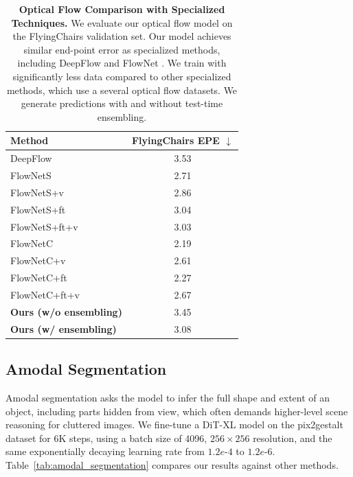 \documentclass[manuscript,screen,review]{acmart}
\begin{document}
\begin{table}[htbp]
  \centering
\begin{tabular}{lc}
\toprule
\textbf{Method} & \textbf{FlyingChairs EPE} $\downarrow$ \\
\midrule
DeepFlow & 3.53 \\
FlowNetS & 2.71 \\
FlowNetS+v & 2.86 \\
FlowNetS+ft & 3.04 \\
FlowNetS+ft+v & 3.03 \\
FlowNetC & 2.19 \\
FlowNetC+v & 2.61 \\
FlowNetC+ft & 2.27 \\
FlowNetC+ft+v & 2.67 \\
\midrule
\textbf{Ours (w/o ensembling)} & 3.45 \\
\textbf{Ours (w/ ensembling)} & 3.08 \\
\bottomrule
\end{tabular}
\caption{\textbf{Optical Flow Comparison with Specialized Techniques.} We evaluate our optical flow model on the FlyingChairs validation set. Our model achieves similar end-point error as specialized methods, including DeepFlow \citep{weinzaepfel2013deepflow} and FlowNet \citep{fischer2015flownet}. We train with significantly less data compared to other specialized methods, which use a several optical flow datasets. We generate predictions with and without test-time ensembling.}
\label{tab:optical_flow}
\end{table}




\subsection{Amodal Segmentation}

Amodal segmentation asks the model to infer the full shape and extent of an object, including parts hidden from view, which often demands higher-level scene reasoning for cluttered images. We fine-tune a DiT-XL model on the pix2gestalt dataset \citep{ozguroglu2024pix2gestalt} for 6K steps, using a batch size of 4096, $256\times256$ resolution, and the same exponentially decaying learning rate from $1.2e\text{-}4$ to $1.2e\text{-}6$. Table~\ref{tab:amodal_segmentation} compares our results against other methods.
\end{document}
